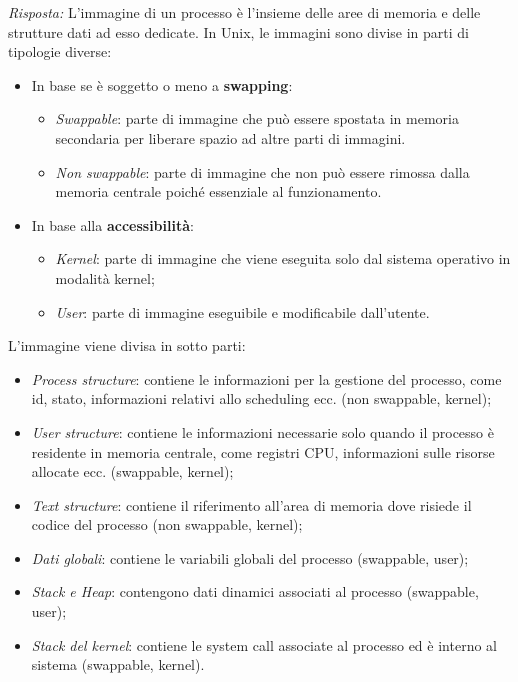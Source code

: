 \documentclass{article}
\newenvironment{solution}
    {\textit{Risposta:}}
    {}
\begin{document}
\begin{solution}
L’immagine di un processo è l’insieme delle aree di memoria e delle strutture dati ad esso dedicate. In Unix, le immagini sono divise in parti di tipologie diverse:
\begin{itemize}
    \item In base se è soggetto o meno a \textbf{swapping}:
    \begin{itemize}
        \item \emph{Swappable}: parte di immagine che può essere spostata in memoria secondaria per liberare spazio ad altre parti di immagini.
        \item \emph{Non swappable}: parte di immagine che non può essere rimossa dalla memoria centrale poiché essenziale al funzionamento.
    \end{itemize}
    \item In base alla \textbf{accessibilità}:
    \begin{itemize}
        \item \emph{Kernel}: parte di immagine che viene eseguita solo dal sistema operativo in modalità kernel;
        \item \emph{User}: parte di immagine eseguibile e modificabile dall’utente.
    \end{itemize}
\end{itemize}
L’immagine viene divisa in sotto parti:
\begin{itemize}
    \item \emph{Process structure}: contiene le informazioni per la gestione del processo, come id, stato, informazioni relativi allo scheduling ecc. (non swappable, kernel);
    \item \emph{User structure}: contiene le informazioni necessarie solo quando il processo è residente in memoria centrale, come registri CPU, informazioni sulle risorse allocate ecc. (swappable, kernel);
    \item \emph{Text structure}: contiene il riferimento all'area di memoria dove risiede il codice del processo (non swappable, kernel);
    \item \emph{Dati globali}: contiene le variabili globali del processo (swappable, user);
    \item \emph{Stack e Heap}: contengono dati dinamici associati al processo (swappable, user);
    \item \emph{Stack del kernel}: contiene le system call associate al processo ed è interno al sistema (swappable, kernel).
\end{itemize}
\newpage
\end{solution}
\end{document}
